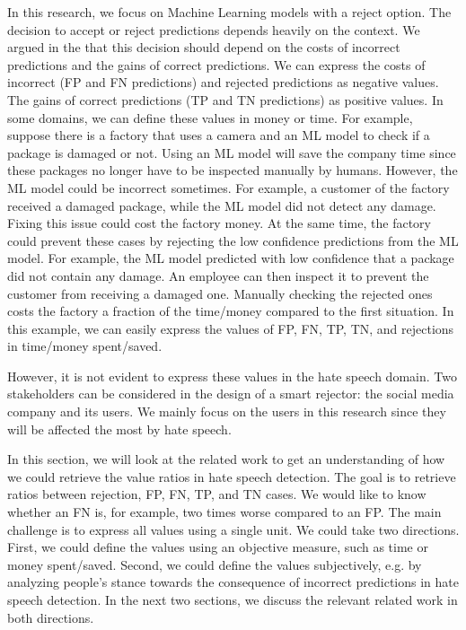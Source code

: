 


In this research, we focus on Machine Learning models with a reject option. The decision to accept or reject predictions depends heavily on the context. We argued in the  that this decision should depend on the costs of incorrect predictions and the gains of correct predictions. We can express the costs of incorrect (FP and FN predictions) and rejected predictions as negative values. The gains of correct predictions (TP and TN predictions) as positive values. In some domains, we can define these values in money or time. For example, suppose there is a factory that uses a camera and an ML model to check if a package is damaged or not. Using an ML model will save the company time since these packages no longer have to be inspected manually by humans. However, the ML model could be incorrect sometimes. For example, a customer of the factory received a damaged package, while the ML model did not detect any damage. Fixing this issue could cost the factory money. At the same time, the factory could prevent these cases by rejecting the low confidence predictions from the ML model. For example, the ML model predicted with low confidence that a package did not contain any damage. An employee can then inspect it to prevent the customer from receiving a damaged one. Manually checking the rejected ones costs the factory a fraction of the time/money compared to the first situation. In this example, we can easily express the values of FP, FN, TP, TN, and rejections in time/money spent/saved.

However, it is not evident to express these values in the hate speech domain. Two stakeholders can be considered in the design of a smart rejector: the social media company and its users. We mainly focus on the users in this research since they will be affected the most by hate speech.

In this section, we will look at the related work to get an understanding of how we could retrieve the value ratios in hate speech detection. The goal is to retrieve ratios between rejection, FP, FN, TP, and TN cases. We would like to know whether an FN is, for example, two times worse compared to an FP. The main challenge is to express all values using a single unit. We could take two directions. First, we could define the values using an objective measure, such as time or money spent/saved. Second, we could define the values subjectively, e.g. by analyzing people's stance towards the consequence of incorrect predictions in hate speech detection. In the next two sections, we discuss the relevant related work in both directions.

